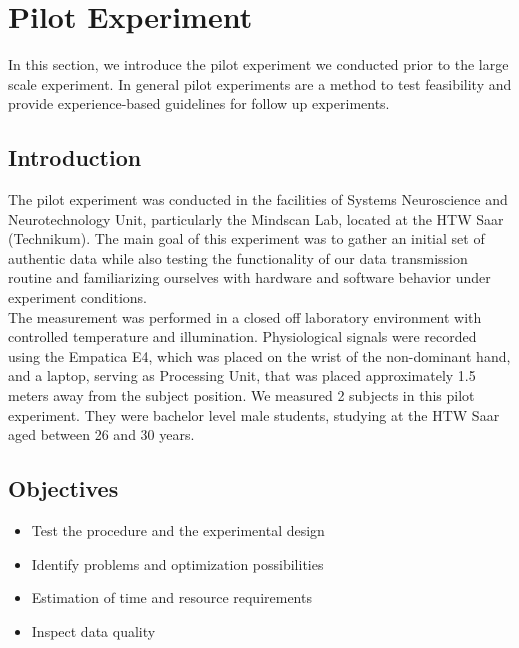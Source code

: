 \section{Pilot Experiment}
In this section, we introduce the pilot experiment we conducted prior to the large scale experiment. In general pilot experiments are a method to test feasibility and provide experience-based guidelines for follow up experiments. 
\subsection{Introduction}
The pilot experiment was conducted in the facilities of Systems Neuroscience and Neurotechnology Unit, particularly the Mindscan Lab, located at the HTW Saar (Technikum). The main goal of this experiment was to gather an initial set of authentic data while also testing the functionality of our data transmission routine and familiarizing ourselves with hardware and software behavior under experiment conditions. \\
The measurement was performed in a closed off laboratory environment with controlled temperature and illumination. Physiological signals were recorded using the Empatica E4, which was placed on the wrist of the non-dominant hand, and a laptop, serving as Processing Unit, that was placed approximately 1.5 meters away from the subject position.
We measured 2 subjects in this pilot experiment. They were bachelor level male students, studying at the HTW Saar aged between 26 and 30 years.

\subsection{Objectives}
\begin{itemize}
\item Test the procedure and the experimental design
\item Identify problems and optimization possibilities
\item Estimation of time and resource requirements
\item Inspect data quality
\end{itemize}
